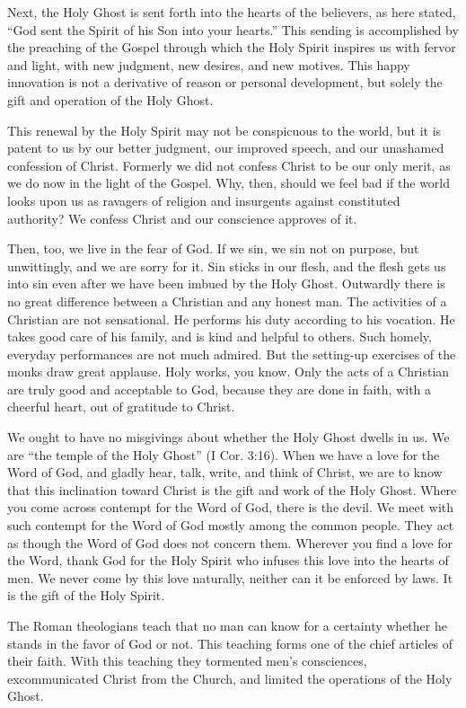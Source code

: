 Next, the Holy Ghost is sent forth into the hearts of the believers, as here stated, “God sent the Spirit of his Son into your hearts.” This sending is accomplished by the preaching of the Gospel through which the Holy Spirit inspires us with fervor and light, with new judgment, new desires, and new motives. This happy innovation is not a derivative of reason or personal development, but solely the gift and operation of the Holy Ghost.

This renewal by the Holy Spirit may not be conspicuous to the world, but it is patent to us by our better judgment, our improved speech, and our unashamed confession of Christ. Formerly we did not confess Christ to be our only merit, as we do now in the light of the Gospel. Why, then, should we feel bad if the world looks upon us as ravagers of religion and insurgents against constituted authority? We confess Christ and our conscience approves of it.

Then, too, we live in the fear of God. If we sin, we sin not on purpose, but unwittingly, and we are sorry for it. Sin sticks in our flesh, and the flesh gets us into sin even after we have been imbued by the Holy Ghost. Outwardly there is no great difference between a Christian and any honest man. The activities of a Christian are not sensational. He performs his duty according to his vocation. He takes good care of his family, and is kind and helpful to others. Such homely, everyday performances are not much admired. But the setting-up exercises of the monks draw great applause. Holy works, you know. Only the acts of a Christian are truly good and acceptable to God, because they are done in faith, with a cheerful heart, out of gratitude to Christ.

We ought to have no misgivings about whether the Holy Ghost dwells in us. We are “the temple of the Holy Ghost” (I Cor. 3:16). When we have a love for the Word of God, and gladly hear, talk, write, and think of Christ, we are to know that this inclination toward Christ is the gift and work of the Holy Ghost. Where you come across contempt for the Word of God, there is the devil. We meet with such contempt for the Word of God mostly among the common people. They act as though the Word of God does not concern them. Wherever you find a love for the Word, thank God for the Holy Spirit who infuses this love into the hearts of men. We never come by this love naturally, neither can it be enforced by laws. It is the gift of the Holy Spirit.

The Roman theologians teach that no man can know for a certainty whether he stands in the favor of God or not. This teaching forms one of the chief articles of their faith. With this teaching they tormented men’s consciences, excommunicated Christ from the Church, and limited the operations of the Holy Ghost.

